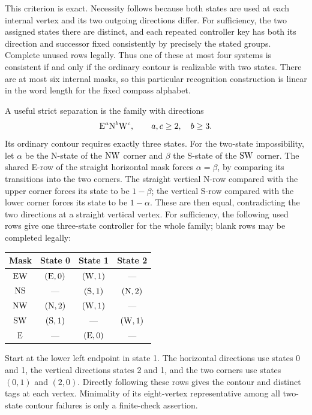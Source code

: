 This criterion is exact. Necessity follows because both states are used at
each internal vertex and its two outgoing directions differ. For sufficiency,
the two assigned states there are distinct, and each repeated controller key
has both its direction and successor fixed consistently by precisely the stated
groups. Complete unused rows legally. Thus one of these at most four systems is
consistent if and only if the ordinary contour is realizable with two states.
There are at most six internal masks, so this particular recognition construction
is linear in the word length for the fixed compass alphabet.

A useful strict separation is the family with directions
\[
 \mathrm{E}^a\mathrm{N}^b\mathrm{W}^c,\qquad a,c\ge2,\quad b\ge3.
\]
Its ordinary contour requires exactly three states. For the two-state
impossibility, let $\alpha$ be the N-state of the $\mathrm{N}\mathrm{W}$ corner and $\beta$ the
S-state of the $\mathrm{S}\mathrm{W}$ corner. The shared E-row of the straight horizontal
mask forces $\alpha=\beta$, by comparing its transitions into the two corners.
The straight vertical N-row compared with the upper corner forces its state to
be $1-\beta$; the vertical S-row compared with the lower corner forces its state
to be $1-\alpha$. These are then equal, contradicting the two directions at a
straight vertical vertex. For sufficiency, the following used rows give one
three-state controller for the whole family; blank rows may be completed legally:
\begin{center}
\begin{tabular}{c@{\qquad}ccc}
\toprule
Mask & State 0 & State 1 & State 2\\
\midrule
$\mathrm{E}\mathrm{W}$ & $(\mathrm{E},0)$ & $(\mathrm{W},1)$ & ---\\
$\mathrm{N}\mathrm{S}$ & --- & $(\mathrm{S},1)$ & $(\mathrm{N},2)$\\
$\mathrm{N}\mathrm{W}$ & $(\mathrm{N},2)$ & $(\mathrm{W},1)$ & ---\\
$\mathrm{S}\mathrm{W}$ & $(\mathrm{S},1)$ & --- & $(\mathrm{W},1)$\\
$\mathrm{E}$ & --- & $(\mathrm{E},0)$ & ---\\
\bottomrule
\end{tabular}
\end{center}
Start at the lower left endpoint in state 1. The horizontal directions use
states 0 and 1, the vertical directions states 2 and 1, and the two corners
use states $(0,1)$ and $(2,0)$. Directly following these rows gives the contour
and distinct tags at each vertex. Minimality of its eight-vertex representative
among all two-state contour failures is only a finite-check assertion.

